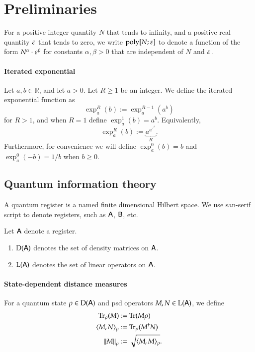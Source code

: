 

\section{Preliminaries}

For a positive integer quantity $N$ that tends to infinity, and a positive real quantity $\varepsilon$ that tends to zero, we write $\operatorname{poly}[N;\varepsilon]$ to denote a function of the form $N^\alpha \cdot \varepsilon^\beta$ for constants $\alpha, \beta > 0$ that are independent of $N$ and $\varepsilon$.

\paragraph{Iterated exponential}
Let $a,b \in \mathbb{R}$, and let $a > 0$. Let $R \geq 1$ be an integer. We define the iterated exponential function as
\[
	\exp^R_a(b) := \exp^{R-1}_a(a^b)
\]
for $R > 1$, and when $R=1$ define $\exp^1_a(b) = a^b$. Equivalently, 
\[
	\exp^R_a(b) := \underbrace{a^{a^{\cdot^{\cdot^{a^b}}}}}_{R}.
\]
Furthermore, for convenience we will define $\exp^0_a(b) = b$ and $\exp^0_a(-b) = 1/b$ when $b \geq 0$.

\subsection{Quantum information theory}

A quantum register is a named finite dimensional Hilbert space. We use san-serif script to denote registers, such as ${\mathsf{A}}$, ${\mathsf{B}}$, etc. 

Let ${\mathsf{A}}$ denote a register.
\begin{enumerate}
	\item $\mathrm{D}({\mathsf{A}})$ denotes the set of density matrices on ${\mathsf{A}}$.
	\item $\mathrm{L}({\mathsf{A}})$ denotes the set of linear operators on ${\mathsf{A}}$.
\end{enumerate}


\paragraph{State-dependent distance measures}

For a quantum state $\rho \in \mathrm{D}({\mathsf{A}})$ and psd operators $M,N \in \mathrm{L}({\mathsf{A}})$, we define 
\begin{align}
	\operatorname{Tr}_\rho(M) &:= \operatorname{Tr}(M \rho) \\
	\langle M, N \rangle_\rho &:= \operatorname{Tr}_\rho (M^\dagger N) \\
	\left\lVert M \right\rVert_\rho & := \sqrt{ \langle M, M \rangle_\rho}.
\end{align}

